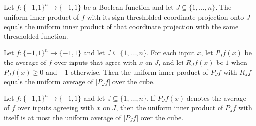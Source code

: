 \begin{theorem}
\label{FABL.uniformInner_coordinateJuntaApproximation}
\leanok
{}
Let $f:\{−1,1\}^n\to\{−1,1\}$ be a Boolean function and let $J\subseteq\{1,\ldots,n\}$.
The uniform inner product of $f$ with its sign-thresholded coordinate projection onto
$J$ equals the uniform inner product of that coordinate projection with the same
thresholded function.
\end{theorem}

\begin{theorem}
\label{FABL.uniformInner_projection_rounding_eq_expect_abs}
\leanok
{}
Let $f:\{−1,1\}^n\to\{−1,1\}$ and let $J\subseteq\{1,\ldots,n\}$. For each input $x$,
let $P_Jf(x)$ be the average of $f$ over inputs that agree with $x$ on $J$, and let
$R_Jf(x)$ be $1$ when $P_Jf(x)\geq0$ and $−1$ otherwise. Then the uniform inner product
of $P_Jf$ with $R_Jf$ equals the uniform average of $|P_Jf|$ over the cube.
\end{theorem}

\begin{theorem}
\label{FABL.uniformInner_projection_self_le_expect_abs}
\leanok
{}
Let $f:\{−1,1\}^n\to\{−1,1\}$ and let $J\subseteq\{1,\ldots,n\}$. If $P_Jf(x)$ denotes
the average of $f$ over inputs agreeing with $x$ on $J$, then the uniform inner product
of $P_Jf$ with itself is at most the uniform average of $|P_Jf|$ over the cube.
\end{theorem}

